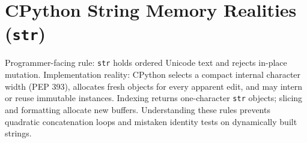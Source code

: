 \section{CPython String Memory Realities (\texttt{str})}

Programmer-facing rule: \texttt{str} holds ordered Unicode text and rejects in-place mutation. Implementation reality: CPython selects a compact internal character width (PEP 393), allocates fresh objects for every apparent edit, and may intern or reuse immutable instances. Indexing returns one-character \texttt{str} objects; slicing and formatting allocate new buffers. Understanding these rules prevents quadratic concatenation loops and mistaken identity tests on dynamically built strings.
